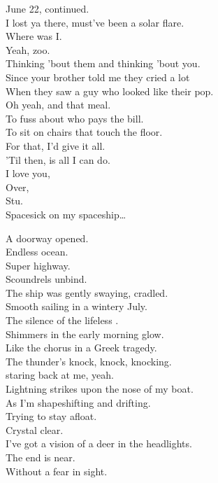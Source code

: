 June 22, continued. \\
I lost ya there, must've been a solar flare. \\
Where was I. \\
Yeah, zoo. \\
Thinking 'bout them and thinking 'bout you. \\
Since your brother told me they cried a lot \\
When they saw a guy who looked like their pop. \\
Oh yeah, and that meal. \\
To fuss about who pays the bill. \\
To sit on chairs that touch the floor. \\
For that, I'd give it all. \\
'Til then,  is all I can do. \\
I love you, \\
Over, \\
Stu. \\

Spacesick on my spaceship… \\





A doorway opened. \\
Endless ocean. \\
Super highway. \\
Scoundrels unbind. \\
The ship was gently swaying, cradled. \\
Smooth sailing in a wintery July. \\
The silence of the lifeless . \\
Shimmers in the early morning glow. \\
Like the chorus in a Greek tragedy. \\
The thunder's knock, knock, knocking. \\
 staring back at me, yeah. \\

Lightning strikes upon the nose of my boat. \\
As I'm shapeshifting and drifting. \\
Trying to stay afloat. \\
Crystal clear. \\
I've got a vision of a deer in the headlights. \\
The end is near. \\
Without a fear in sight. \\

